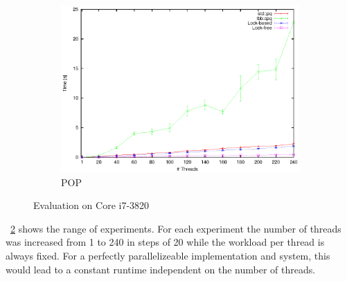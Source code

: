 \begin{figure}[t]
\begin{subfigure}[b]{0.3\textwidth}
		\centering
		\includegraphics[width=\textwidth]{../plots/i7_pop/runtime_pop_i7}
		\caption{POP}
		\label{fig:i7_pop}
	\end{subfigure}
	\caption{Evaluation on Core i7-3820}
	\label{fig:eval_i7}
\end{figure}
\figurename~\ref{fig:eval_i7} shows the range of experiments. For each experiment the number of threads was increased from 1 to 240 in steps of 20 while the workload per thread is always fixed. For a perfectly parallelizeable implementation and system, this would lead to a constant runtime independent on the number of threads.
